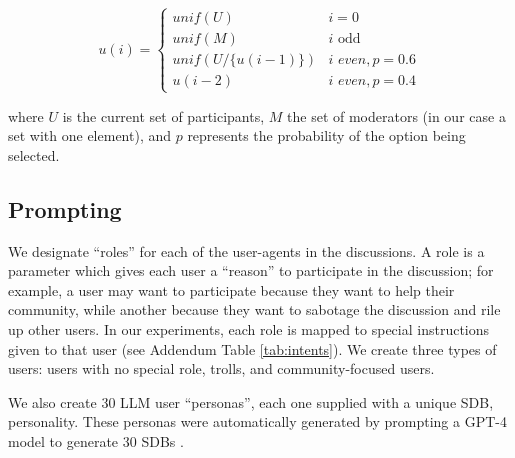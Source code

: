 \small
\begin{equation}
\label{eq:turn_taking}
    u(i) = \left\{
\begin{array}{ll}
\textit{unif}(U) & i=0\\
    \textit{unif}(M) & i \text{ odd}\\
    \textit{unif}(U/\{u(i-1)\}) & i \textit{ even}, p=0.6 \\
    u(i-2) & i \textit{ even}, p=0.4 
\end{array} 
\right.
\end{equation}
\normalsize

\noindent where $U$ is the current set of participants, $M$ the set of moderators (in our case a set with one element), and $p$ represents the probability of the option being selected.


\subsection{Prompting}

We designate “roles” for each of the user-agents in the discussions. A role is a parameter which gives each user a “reason” to participate in the discussion; for example, a user may want to participate because they want to help their community, while another because they want to sabotage the discussion and rile up other users. In our experiments, each role is mapped to special instructions given to that user (see Addendum Table \ref{tab:intents}). We create three types of users: users with no special role, trolls, and community-focused users.

We also create 30 \ac{LLM} user “personas”,  each one supplied with a unique \ac{SDB}, personality. These personas were automatically generated by prompting a GPT-4 model to generate $30$ \acp{SDB} \cite{openai2024gpt4technicalreport}.

